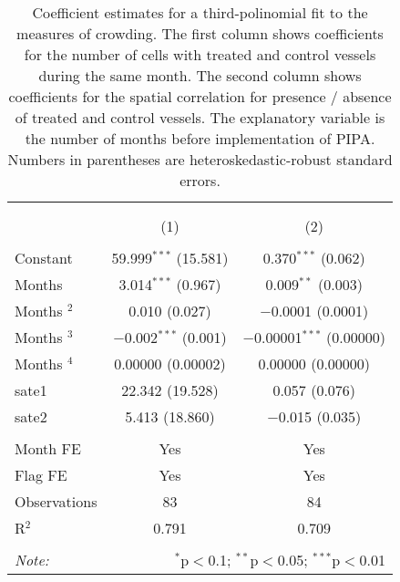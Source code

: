 
\begin{table}[!htbp] \centering 
  \caption{\label{tab:sp_corr}Coefficient estimates for a third-polinomial fit to the measures of crowding. The first column shows coefficients for the number of cells with treated and control vessels during the same month. The second column shows coefficients for the spatial correlation for presence / absence of treated and control vessels. The explanatory variable is the number of months before implementation of PIPA. Numbers in parentheses are heteroskedastic-robust standard errors.} 
  \label{} 
\footnotesize 
\begin{tabular}{@{\extracolsep{1pt}}lcc} 
\\[-1.8ex]\hline 
\hline \\[-1.8ex] 
\\[-1.8ex] & (1) & (2)\\ 
\hline \\[-1.8ex] 
 Constant & 59.999$^{***}$ (15.581) & 0.370$^{***}$ (0.062) \\ 
  Months & 3.014$^{***}$ (0.967) & 0.009$^{**}$ (0.003) \\ 
  Months $^2$ & 0.010 (0.027) & $-$0.0001 (0.0001) \\ 
  Months $^3$ & $-$0.002$^{***}$ (0.001) & $-$0.00001$^{***}$ (0.00000) \\ 
  Months $^4$ & 0.00000 (0.00002) & 0.00000 (0.00000) \\ 
  sate1 & 22.342 (19.528) & 0.057 (0.076) \\ 
  sate2 & 5.413 (18.860) & $-$0.015 (0.035) \\ 
 \hline \\[-1.8ex] 
Month FE & Yes & Yes \\ 
Flag FE & Yes & Yes \\ 
Observations & 83 & 84 \\ 
R$^{2}$ & 0.791 & 0.709 \\ 
\hline 
\hline \\[-1.8ex] 
\textit{Note:}  & \multicolumn{2}{r}{$^{*}$p$<$0.1; $^{**}$p$<$0.05; $^{***}$p$<$0.01} \\ 
\end{tabular} 
\end{table} 
